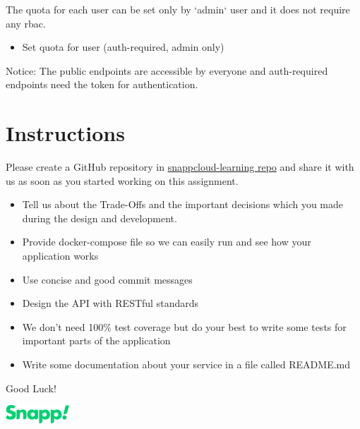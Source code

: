 \documentclass{article}
\begin{document}
The quota for each user can be set only by `admin` user and it does not require any rbac.

\begin{itemize}
  \item Set quota for user (auth-required, admin only)
\end{itemize}


Notice: The public endpoints are accessible by everyone and auth-required endpoints need the token for authentication.

\section{Instructions}

Please create a GitHub repository in \href{https://github.com/orgs/snappcloud-learning/repositories}{snappcloud-learning repo}  and share it with us as soon as you started working on this assignment.

\begin{itemize}
  \item Tell us about the Trade-Offs and the important decisions which you made during the design and development.
  \item Provide docker-compose file so we can easily run and see how your application works
  \item Use concise and good commit messages
  \item Design the API with RESTful standards
  \item We don’t need 100\% test coverage but do your best to write some tests for important parts of the application
  \item Write some documentation about your service in a file called README.md
\end{itemize}

Good Luck!

\vspace{1cm}
\includegraphics[width=.25\textwidth]{./snapp.png}
\end{document}
